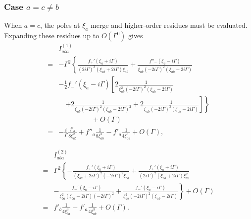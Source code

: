\documentclass[twocolumn,superscriptaddress]{revtex4-1}
\begin{document}
\subsubsection{Case $a=c\neq b$}
When $a=c$, the poles at $\xi_a$ merge and higher-order residues must be evaluated.
Expanding these residues up to $O(\Gamma^0)$ gives
\begin{align}
  &I_{aba}^{(1)}\nonumber \\
=& -\Gamma^2\left\{
\frac{f_+'(\xi_a+i\Gamma)}{(2i\Gamma)^3(\xi_{ab}+2i\Gamma)\xi_{ab}}
+\frac{f''_-(\xi_a-i\Gamma)}{\xi_{ab}(-2i\Gamma)^2(\xi_{ab}-2i\Gamma)} \right. \nonumber \\
&-\frac{1}{2}f_-'(\xi_a-i\Gamma)\left[
2\frac{1}{\xi_{ab}^2(-2i\Gamma)^2(\xi_{ab}-2i\Gamma)}\right. \nonumber \\
&\quad\left.\left.
+2\frac{1}{\xi_{ab}(-2i\Gamma)^2(\xi_{ab}-2i\Gamma)^2}
+2\frac{1}{\xi_{ab}(-2i\Gamma)^3(\xi_{ab}-2i\Gamma)}
\right]
\right\}\nonumber\\
&\hspace{2cm}+O(\Gamma)\nonumber \\
=&-\frac{i}{\Gamma}\frac{f'_a}{8\xi_{ab}^2}+f''_a\frac{1}{8\xi_{ab}^2}-f'_a\frac{1}{4\xi_{ab}^3}+O(\Gamma),
\end{align}

\begin{align}
  &I_{aba}^{(2)}\nonumber \\
=&
\Gamma^2\left\{
-\frac{f_+'(\xi_b+i\Gamma)}{(\xi_{ba}+2i\Gamma)^2(-2i\Gamma)^2\xi_{ba}}
+\frac{f_+'(\xi_a+i\Gamma)}{(2i\Gamma)^2(\xi_{ab}+2i\Gamma)\xi_{ab}^2}\right. \nonumber \\
&\left.
-\frac{f_-'(\xi_b-i\Gamma)}{\xi_{ba}^2(\xi_{ba}-2i\Gamma)(-2i\Gamma)^2}
+\frac{f_-'(\xi_a-i\Gamma)}{\xi_{ab}^2(-2i\Gamma)^2(\xi_{ab}-2i\Gamma)}
\right\} +O(\Gamma) \nonumber \\
=&
f'_b\frac{1}{4\xi_{ba}^3}
-f'_a\frac{1}{4\xi_{ab}^3}+O(\Gamma).
\end{align}
\end{document}
